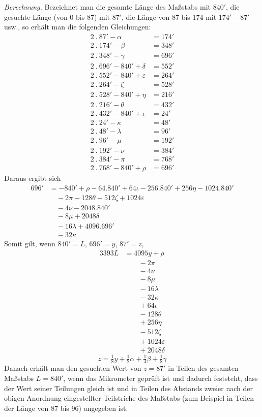 \textit{Berechnung.} Bezeichnet man die gesamte Länge des Maßstabs mit $840'$, die gesuchte Länge (von 0 bis 87) mit $87'$, die Länge von 87 bis 174 mit $174'-87'$ usw., so erhält man die folgenden Gleichungen:
\[
\begin{aligned}
2\ .\ 87'-\alpha&=174'\\
2\ .\ 174'-\beta&=348'\\
2\ .\ 348'-\gamma&=696'\\
2\ .\ 696'-840'+\delta&=552'\\
2\ .\ 552'-840'+\varepsilon&=264'\\
2\ .\ 264'-\zeta&=528'\\
2\ .\ 528'-840'+\eta&=216'\\
2\ .\ 216'-\theta&=432'\\
2\ .\ 432'-840'+\iota&=24'\\
2\ .\ 24'-\kappa&=48'\\
2\ .\ 48'-\lambda&=96'\\
2\ .\ 96'-\mu&=192'\\
2\ .\ 192'-\nu&=384'\\
2\ .\ 384'-\pi&=768'\\
2\ .\ 768'-840'+\rho&=696'
\end{aligned}
\]
Daraus ergibt sich
\[
\begin{aligned}
696'&=-840'+\rho-64.840'+64\iota-256.840'+256\eta-1024.840'\\
&\quad-2\pi-128\theta-512\zeta+1024\varepsilon\\
&\quad-4\nu-2048.840'\\
&\quad-8\mu+2048\delta\\
&\quad-16\lambda+4096.696'\\
&\quad-32\kappa
\end{aligned}
\]
Somit gilt, wenn $840'=L$, $696'=y$, $87'=z$,
\[
\begin{aligned}
3393L&=4095y+\rho\\
&\qquad-2\pi\\
&\qquad-4\nu\\
&\qquad-8\mu\\
&\qquad-16\lambda\\
&\qquad-32\kappa\\
&\qquad+64\iota\\
&\qquad-128\theta\\
&\qquad+256\eta\\
&\qquad-512\zeta\\
&\qquad+1024\varepsilon\\
&\qquad+2048\delta
\end{aligned}
\]
\[
z=\tfrac18y+\tfrac12\alpha+\tfrac14\beta+\tfrac18\gamma
\]
Danach erhält man den gesuchten Wert von $z=87'$ in Teilen des gesamten Maßstabs $L=840'$, wenn das Mikrometer geprüft ist und dadurch feststeht, dass der Wert seiner Teilungen gleich ist und in Teilen des Abstands zweier nach der obigen Anordnung eingestellter Teilstriche des Maßstabs (zum Beispiel in Teilen der Länge von 87 bis 96) angegeben ist.

